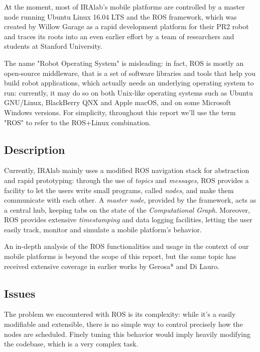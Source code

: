\documentclass[a4paper,12pt]{report}
\begin{document}
At the moment, most of IRAlab's mobile platforms are controlled by a master node running Ubuntu Linux 16.04 LTS and the ROS framework, which was created by Willow Garage as a rapid development platform for their PR2 robot and traces its roots into an even earlier effort by a team of researchers and students at Stanford University. 

The name "Robot Operating System" is misleading: in fact, ROS is mostly an open-source middleware, that is a set of software libraries and tools that help you build robot applications, which actually needs an underlying operating system to run: currently, it may do so on both Unix-like operating systems such as Ubuntu GNU/Linux, BlackBerry QNX\cite{qnx-ros} and Apple macOS, and on some Microsoft Windows versions. For simplicity, throughout this report we'll use the term "ROS" to refer to the ROS+Linux combination.

\subsection{Description}

Currently, IRAlab mainly uses a modified ROS navigation stack for abstraction and rapid prototyping: through the use of \textit{topics} and \textit{messages}, ROS provides a facility to let the users write small programs, called \textit{nodes}, and make them communicate with each other. A \textit{master node}, provided by the framework, acts as a central hub, keeping tabs on the state of the \textit{Computational Graph}. Moreover, ROS provides extensive \textit{timestamping} and data logging facilities, letting the user easily track, monitor and simulate a mobile platform's behavior.

An in-depth analysis of the ROS functionalities and usage in the context of our mobile platforms is beyond the scope of this report, but the same topic has received extensive coverage in earlier works by Gerosa* and Di Lauro\cite{fdila-bs-otto}.

\subsection{Issues}

The problem we encountered with ROS is its complexity: while it's a easily modifiable and extensible, there is no simple way to control precisely how the nodes are scheduled. Finely tuning this behavior would imply heavily modifying the codebase, which is a very complex task. 
\end{document}
